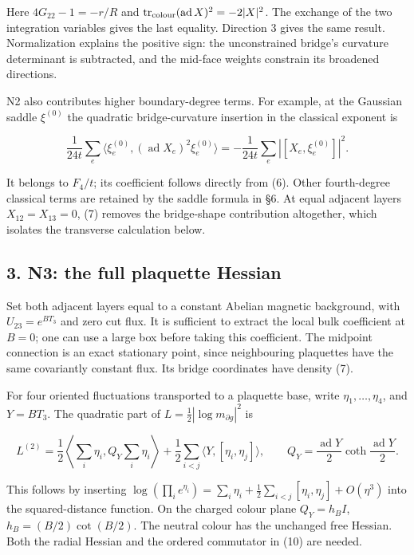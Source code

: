 \documentclass[11pt,a4paper]{article}
\begin{document}
Here \(4G_{22}-1=-r/R\) and
\(\operatorname{tr}_{\rm colour}(\operatorname{ad}X)^2=-2|X|^2\). The
exchange of the two integration variables gives the last equality.
Direction 3 gives the same result. Normalization explains the positive
sign: the unconstrained bridge's curvature determinant is subtracted,
and the mid-face weights constrain its broadened directions.

N2 also contributes higher boundary-degree terms. For example, at the
Gaussian saddle \(\xi^{(0)}\) the quadratic bridge-curvature insertion
in the classical exponent is

\[\frac1{24t}\sum_e
 \langle\xi_e^{(0)},(\operatorname{ad}X_e)^2\xi_e^{(0)}\rangle
 =-\frac1{24t}\sum_e|[X_e,\xi_e^{(0)}]|^2.\tag{9}\]

It belongs to \(F_4/t\); its coefficient follows directly from (6).
Other fourth-degree classical terms are retained by the saddle formula
in §6. At equal adjacent layers \(X_{12}=X_{13}=0\), (7) removes the
bridge-shape contribution altogether, which isolates the transverse
calculation below.

\hypertarget{n3-the-full-plaquette-hessian}{%
\subsection{3. N3: the full plaquette
Hessian}\label{n3-the-full-plaquette-hessian}}

Set both adjacent layers equal to a constant Abelian magnetic
background, with \(U_{23}=e^{BT_3}\) and zero cut flux. It is sufficient
to extract the local bulk coefficient at \(B=0\); one can use a large
box before taking this coefficient. The midpoint connection is an exact
stationary point, since neighbouring plaquettes have the same
covariantly constant flux. Its bridge coordinates have density (7).

For four oriented fluctuations transported to a plaquette base, write
\(\eta_1,\ldots,\eta_4\), and \(Y=BT_3\). The quadratic part of
\(L=\tfrac12|\log m_{\partial g}|^2\) is

\[L^{(2)}=\frac12\left\langle\sum_i\eta_i,
 Q_Y\sum_i\eta_i\right\rangle
 +\frac12\sum_{i<j}\langle Y,[\eta_i,\eta_j]\rangle,
\qquad Q_Y=\frac{\operatorname{ad}Y}{2}
 \coth\frac{\operatorname{ad}Y}{2}.\tag{10}\]

This follows by inserting
\(\log(\prod_i e^{\eta_i})=\sum_i\eta_i+\tfrac12\sum_{i<j}[\eta_i,\eta_j] +O(\eta^3)\)
into the squared-distance function. On the charged colour plane
\(Q_Y=h_B I\), \(h_B=(B/2)\cot(B/2)\). The neutral colour has the
unchanged free Hessian. Both the radial Hessian and the ordered
commutator in (10) are needed.
\end{document}
